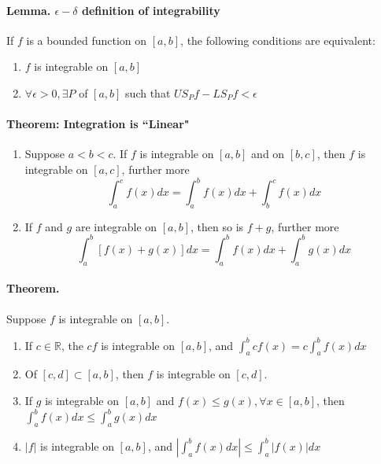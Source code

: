 \documentclass[11pt]{article}
\begin{document}
\paragraph{Lemma. $\epsilon-\delta$ definition of integrability} If $f$ is a bounded function on $[a,b]$, the following conditions are equivalent:
\begin{enumerate}
    \item $f$ is integrable on $[a,b]$
    \item $\forall \epsilon > 0, \exists P$ of $[a,b]$ such that $US_Pf - LS_Pf < \epsilon$
\end{enumerate}

\paragraph{Theorem:  Integration is ``Linear"}
\begin{enumerate}
    \item Suppose $a < b<c$. If $f$ is integrable on $[a,b]$ and on $[b,c]$, then $f$ is integrable on $[a,c]$, further more
    \begin{equation*}
        \int_a^c f(x)dx = \int_a^b f(x)dx + \int_b^c f(x)dx
    \end{equation*}
    \item If $f$ and $g$ are integrable on $[a,b]$, then so is $f+g$, further more
    \begin{equation*}
        \int_a^b [f(x) + g(x)]dx = \int_a^b f(x)dx + \int_a^b g(x)dx
    \end{equation*}
\end{enumerate}

\paragraph{Theorem.} Suppose $f$ is integrable on $[a,b]$.
\begin{enumerate}
    \item If $c\in \mathbb{R}$, the $cf$ is integrable on $[a,b]$, and $\int_a^b cf(x) = c\int_a^bf(x)dx$
    \item Of $[c,d] \subset [a,b]$, then $f$ is integrable on $[c,d]$.
    \item If $g$ is integrable on $[a,b]$ and $f(x) \leq g(x),\forall x \in [a,b]$, then $\int_a^b f(x)dx\leq \int_a^b g(x)dx$
    \item $|f|$ is integrable on $[a,b]$, and $\left|\int_a^bf(x)dx\right| \leq \int_a^b |f(x)|dx$
\end{enumerate}
\end{document}
